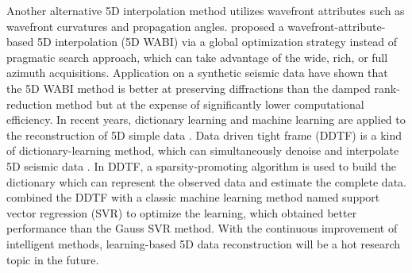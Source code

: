 Another alternative 5D interpolation method utilizes wavefront attributes such as wavefront curvatures and propagation angles. \cite{Xie2017} proposed a wavefront-attribute-based 5D interpolation (5D WABI) via a global optimization strategy instead of pragmatic search approach, which can take advantage of the wide, rich, or full azimuth acquisitions. Application on a synthetic seismic data have shown that the 5D WABI method is better at preserving diffractions than the damped rank-reduction method but at the expense of significantly lower computational efficiency.
In recent years, dictionary learning and machine learning are applied to the reconstruction of 5D simple data \citep{YuSiwei2015, Jia2017, Jia2018}. Data driven tight frame (DDTF) is a kind of dictionary-learning method, which can simultaneously denoise and interpolate 5D seismic data \citep{YuSiwei2015}. In DDTF, a sparsity-promoting algorithm is used to build the dictionary which can represent the observed data and estimate the complete data. \cite{Jia2017} combined the DDTF with a classic machine learning method named support vector regression (SVR) to optimize the learning, which obtained better performance than the Gauss SVR method. With the continuous improvement of intelligent methods, learning-based 5D data reconstruction will be a hot research topic in the future.


